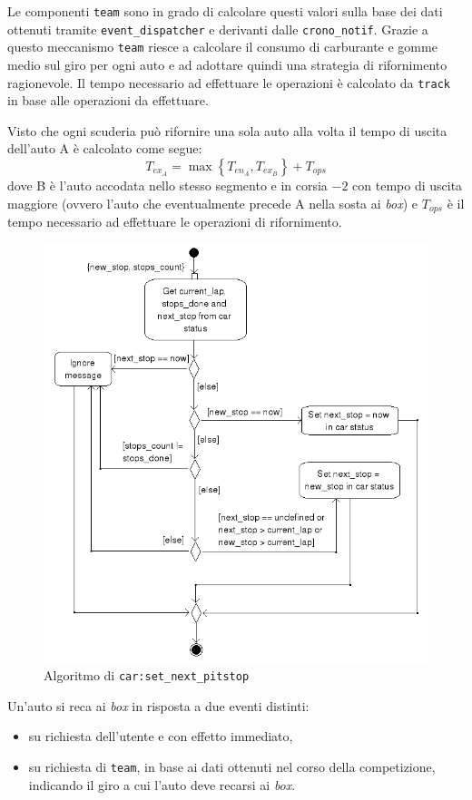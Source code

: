 \documentclass[a4paper]{report}
\newcommand{\fun}[1]{\texttt{#1}}
\begin{document}
Le componenti \texttt{team} sono in grado di calcolare questi valori sulla base dei dati ottenuti tramite \texttt{event\_dispatcher} e derivanti dalle \texttt{crono\_notif}. Grazie a questo meccanismo \texttt{team} riesce a calcolare il consumo di carburante e gomme medio sul giro per ogni auto e ad adottare quindi una strategia di rifornimento ragionevole.
Il tempo necessario ad effettuare le operazioni è calcolato da \texttt{track} in base alle operazioni da effettuare.

Visto che ogni scuderia può rifornire una sola auto alla volta il tempo di uscita dell'auto A è calcolato come segue:
\[ T_{ex_A} = \max \left\{ T_{en_A}, T_{ex_B} \right\} + T_{ops} \]
dove B è l'auto accodata nello stesso segmento e in corsia $-2$ con tempo di uscita maggiore (ovvero l'auto che eventualmente precede A nella sosta ai \textit{box}) e $T_{ops}$ è il tempo necessario ad effettuare le operazioni di rifornimento.

\begin{figure}
\includegraphics[width=\textwidth]{diagrammi/NextPitstop}
\caption{Algoritmo di \fun{car:set\_next\_pitstop}}
\label{fig:nextPitstop}
\end{figure}

Un'auto si reca ai \textit{box} in risposta a due eventi distinti:
\begin{itemize}
\item su richiesta dell'utente e con effetto immediato,
\item su richiesta di \texttt{team}, in base ai dati ottenuti nel corso della competizione, indicando il giro a cui l'auto deve recarsi ai \textit{box}.
\end{itemize}
\end{document}
